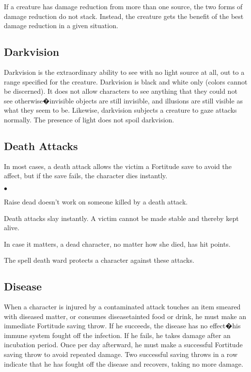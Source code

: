 If a creature has damage reduction from more than one source, the two forms of damage reduction do not stack. Instead, the creature gets the benefit of the best damage reduction in a given situation. 

\subsection{Darkvision}

Darkvision is the extraordinary ability to see with no light source at all, out to a range specified for the creature. Darkvision is black and white only (colors cannot be discerned). It does not allow characters to see anything that they could not see otherwise�invisible objects are still invisible, and illusions are still visible as what they seem to be. Likewise, darkvision subjects a creature to gaze attacks normally. The presence of light does not spoil darkvision.

\subsection{Death Attacks}

In most cases, a death attack allows the victim a Fortitude save to avoid the affect, but if the save fails, the character dies instantly.

\begin{list}{$\bullet$}{\itemspace}
	\item Raise dead doesn't work on someone killed by a death attack. 
	\item Death attacks slay instantly. A victim cannot be made stable and thereby kept alive.
	\item In case it matters, a dead character, no matter how she died, has  hit points.
	\item The spell death ward protects a character against these attacks.
\end{list}

\subsection{Disease}

When a character is injured by a contaminated attack touches an item smeared with diseased matter, or consumes disease\textendash tainted food or drink, he must make an immediate Fortitude saving throw. If he succeeds, the disease has no effect�his immune system fought off the infection. If he fails, he takes damage after an incubation period. Once per day afterward, he must make a successful Fortitude saving throw to avoid repeated damage. Two successful saving throws in a row indicate that he has fought off the disease and recovers, taking no more damage.

